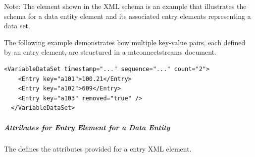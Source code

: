 \documentclass{mtconnect}	%
\providecommand{\DIFadd}[1]{{\hspace{0pt}\protect\color{blue}#1}} %
\begin{document}
\DIFadd{Note: The  element shown in the XML schema is an example that illustrates the schema for a \gls{data entity} element and its associated \gls{entry} elements representing a \gls{data set}.
}

\DIFadd{The following example demonstrates how multiple \glspl{key-value pair}, each defined by an \gls{entry} element, are structured in a \gls{mtconnectstreams} document.
}\begin{lstlisting}[firstnumber=1,escapechar=|,%
    caption={Example of multiple key-value pairs Reported for a Data Entity},label={lst:example-of-multiple-key-value-pairs-reported-for-a-data-entity}]
  <VariableDataSet timestamp="..." sequence="..." count="2">
    <Entry key="a101">100.21</Entry>
    <Entry key="a102">609</Entry>
    <Entry key="a103" removed="true" />
  </VariableDataSet>
\end{lstlisting}

\subparagraph{\DIFadd{Attributes for Entry Element for a Data Entity}}\DIFadd{\mbox{}
}\label{sec:Attributes for Entry Element for a Data Entity}

\DIFadd{The  defines the attributes provided for a \gls{entry} XML element. 
}
\end{document}
